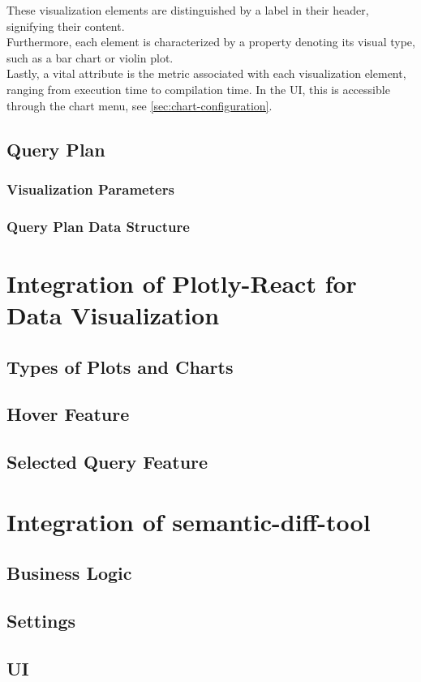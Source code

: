 These visualization elements are distinguished by a label in their header, signifying their content.\\
Furthermore, each element is characterized by a property denoting its visual type, such as a bar chart or violin plot.\\
Lastly, a vital attribute is the metric associated with each visualization element, ranging from execution time to compilation time. In the UI, this is accessible through the chart menu, see \ref{sec:chart-configuration}.










\subsection{Query Plan}
\subsubsection{Visualization Parameters}\label{sec:query-plan-parameters}
\subsubsection{Query Plan Data Structure}\label{sec:query-plan-structure}















\section{Integration of Plotly-React for Data Visualization}
\subsection{Types of Plots and Charts}
\subsection{Hover Feature}
\subsection{Selected Query Feature}

\section{Integration of semantic-diff-tool}\label{sec:semantic-diff-integration}
\subsection{Business Logic}
\subsection{Settings}
\subsection{UI}
